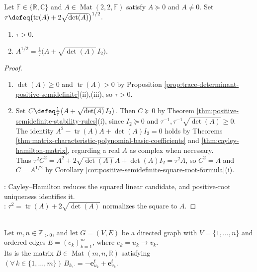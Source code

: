 \begin{proposition} \label{prop:two-by-two-positive-semidefinite-square-root} \\
Let $\mathbb{F}\in\{\mathbb{R},\mathbb{C}\}$ and $A\in\operatorname{Mat}(2,2,\mathbb{F})$ satisfy $A\succeq0$ and $A\neq0$. Set $\tau\defeq\bigl(\operatorname{tr}(A)+2\sqrt{\det(A)}\bigr)^{1/2}$.
\begin{enumerate}[label=(\roman*)]
\setlength{\itemsep}{0pt}
\item $\tau>0$.
\item $A^{1/2}=\frac{1}{\tau}\bigl(A+\sqrt{\det(A)}\,I_2\bigr)$.
\end{enumerate}
\begin{proof}
\begin{enumerate}[label=(\roman*)]
\setlength{\itemsep}{0pt}
\item $\det(A)\geq0$ and $\operatorname{tr}(A)>0$ by Proposition \ref{prop:trace-determinant-positive-semidefinite}(ii),(iii), so $\tau>0$.
\item Set $C\defeq\frac{1}{\tau}\bigl(A+\sqrt{\det(A)}\,I_2\bigr)$. Then $C\succeq0$ by Theorem \ref{thm:positive-semidefinite-stability-rules}(i), since $I_2\succeq0$ and $\tau^{-1},\tau^{-1}\sqrt{\det(A)}\geq0$.\\
The identity $A^2-\operatorname{tr}(A)A+\det(A)I_2=0$ holds by Theorems \ref{thm:matrix-characteristic-polynomial-basic-coefficients} and \ref{thm:cayley-hamilton-matrix}, regarding a real $A$ as complex when necessary.\\
Thus $\tau^2C^2=A^2+2\sqrt{\det(A)}A+\det(A)I_2=\tau^2A$, so $C^2=A$ and $C=A^{1/2}$ by Corollary \ref{cor:positive-semidefinite-square-root-formula}(i).
\end{enumerate}
: Cayley--Hamilton reduces the squared linear candidate, and positive-root uniqueness identifies it.\\
: $\tau^2=\operatorname{tr}(A)+2\sqrt{\det(A)}$ normalizes the square to $A$.
\end{proof}
\end{proposition}

\begin{definition} \label{def:directed-incidence-matrix} \\
Let $m,n\in\mathbb{Z}_{>0}$, and let $G=(V,E)$ be a directed graph with $V=\{1,\ldots,n\}$ and ordered edges $E=(e_k)_{k=1}^m$, where $e_k=u_k\to v_k$.\\
Its  is the matrix $B\in\operatorname{Mat}(m,n,\mathbb{R})$ satisfying $(\forall\,k\in\{1,\ldots,m\})\,B_{k,\cdot}=-\mathbf{e}_{u_k}^t+\mathbf{e}_{v_k}^t$.
\end{definition}

